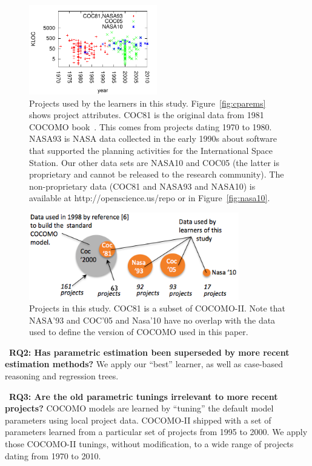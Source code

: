 \documentclass[smallcondesed]{svjour3}
\newcommand{\fig}[1]{Figure~\ref{fig:#1}}
\newcommand{\ADD}[1]{#1}
\begin{document}
\begin{figure}[!b]
\begin{minipage}{2.3in}
\noindent\includegraphics[width=2.2in]{yearLOC.pdf}
\end{minipage}
\caption{Projects used by the learners in this study. \fig{cparems}
shows project attributes. 
COC81 is the original data from 1981 COCOMO book~\cite{boehm81}. 
This comes from projects dating 1970 to 1980.
NASA93 is NASA data collected  in the early 1990s
 about software that supported  the planning activities for the International
Space Station. 
Our other data sets are  NASA10 and COC05 (the latter is
proprietary and 
cannot be released to the research community). 
The non-proprietary data  (COC81 and NASA93 and NASA10) is available at
http://openscience.us/repo or in \fig{nasa10}.
}\label{fig:types}
\end{figure}

\begin{figure}[!b]
\begin{center}
\includegraphics[width=3.6in]{datasets1.png}
\end{center}
\caption{\ADD{Projects in this study. COC81 is a subset of COCOMO-II.  Note that NASA'93 and
COC'05 and Nasa'10 have no
overlap with the data used to define the version of COCOMO
used in this paper. }}\label{fig:dataused}
\end{figure} 

  



~{\bf RQ2: Has parametric estimation been superseded
 by more recent estimation methods?}  We  
 apply our ``best''
learner, as well as 
case-based reasoning and regression trees.

~{\bf RQ3: Are the old parametric tunings irrelevant
  to more recent projects?}  
  COCOMO models are learned by ``tuning''
  the default model parameters using local
  project data. COCOMO-II shipped with a set
  of parameters learned from a particular set of
  projects from 1995 to 2000. We apply those 
COCOMO-II tunings, without modification, to a wide range of projects dating from
1970 to 2010.
\end{document}
